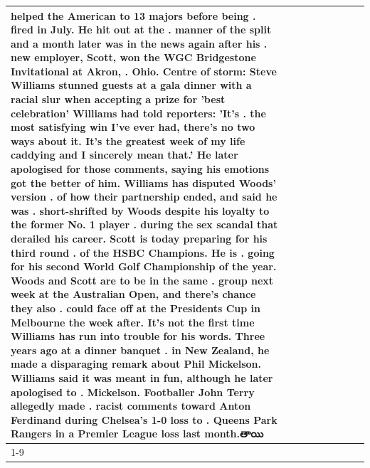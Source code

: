 \begin{table}[H]
\begin{tabular}{lllrlllll}
helped the American to 13 majors before being . fired in July. He hit out at the . manner of the split and a month later was in the news again after his . new employer, Scott, won the WGC Bridgestone Invitational at Akron, . Ohio. Centre of storm: Steve Williams stunned guests at a gala dinner with a racial slur when accepting a prize for 'best celebration' Williams had told reporters: 'It's . the most satisfying win I've ever had, there's no two ways about it. It's the greatest week of my life caddying and I sincerely mean that.' He later apologised for those comments, saying his emotions got the better of him. Williams has disputed Woods' version . of how their partnership ended, and said he was . short-shrifted by Woods despite his loyalty to the former No. 1 player . during the sex scandal that derailed his career. Scott is today preparing for his third round . of the HSBC Champions. He is . going for his second World Golf Championship of the year. Woods and Scott are to be in the same . group next week at the Australian Open, and there's chance they also . could face off at the Presidents Cup in Melbourne the week after. It's not the first time Williams has run into trouble for his words. Three years ago at a dinner banquet . in New Zealand, he made a disparaging remark about Phil Mickelson. Williams said it was meant in fun, although he later apologised to . Mickelson. Footballer John Terry allegedly made . racist comments toward Anton Ferdinand during Chelsea's 1-0 loss to . Queens Park Rangers in a Premier League loss last month.తాయి \\
\cline{1-9}

\end{tabular}
\end{table}
